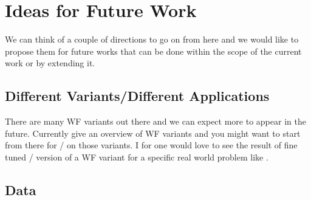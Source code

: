 



\section*{Ideas for Future Work}\label{sec:ideas_for_future_work}

We can think of a couple of directions to go on from here and we would like to propose them for future works that can be done within the scope of 
the current work or by extending it.

\subsection*{Different Variants/Different Applications}

There are many \ac{WF}\cite{Jaganathan2015}\cite{Liu2019} variants out there and we can expect more to appear in the future. 
Currently \cite{Jaganathan2015}\cite{Liu2019}\cite{Chandra2017} give an overview of \ac{WF} variants and you might want to start from there for 
\du/\au\cite{Monga2019} on those variants. I for one would love to see the result of fine tuned 
\du/\au\cite{Monga2019} version of a \ac{WF} variant for a specific real world problem like \cite{Fogel2013}. 

\subsection*{Data}

